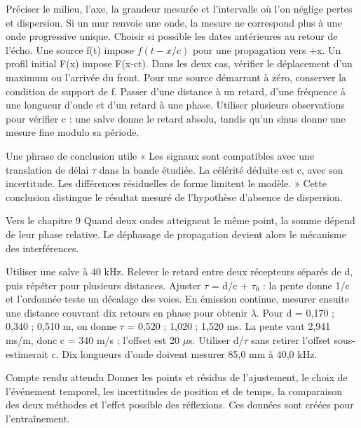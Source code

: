 Préciser le milieu, l’axe, la grandeur mesurée et l’intervalle où l’on néglige pertes et dispersion. Si un mur renvoie une onde, la mesure ne correspond plus à une onde progressive unique. Choisir si possible les dates antérieures au retour de l’écho.
Une source f(t) impose $f(t-x/c)$ pour une propagation vers +x. Un profil initial F(x) impose F(x-ct). Dans les deux cas, vérifier le déplacement d’un maximum ou l’arrivée du front. Pour une source démarrant à zéro, conserver la condition de support de f.
Passer d’une distance à un retard, d’une fréquence à une longueur d’onde et d’un retard à une phase. Utiliser plusieurs observations pour vérifier c : une salve donne le retard absolu, tandis qu’un sinus donne une mesure fine modulo sa période.
\begin{methode}{Une phrase de conclusion utile}
« Les signaux sont compatibles avec une translation de délai \ensuremath{\tau} dans la bande étudiée. La célérité déduite est c, avec son incertitude. Les différences résiduelles de forme limitent le modèle. » Cette conclusion distingue le résultat mesuré de l’hypothèse d’absence de dispersion.
\end{methode}
\begin{docu}{Vers le chapitre 9}
Quand deux ondes atteignent le même point, la somme dépend de leur phase relative. Le déphasage de propagation devient alors le mécanisme des interférences.
\end{docu}


Utiliser une salve à 40 kHz. Relever le retard entre deux récepteurs séparés de d, puis répéter pour plusieurs distances. Ajuster \ensuremath{\tau} = d/c + \ensuremath{\tau_0} : la pente donne 1/c et l’ordonnée teste un décalage des voies. En émission continue, mesurer ensuite une distance couvrant dix retours en phase pour obtenir \ensuremath{\lambda}.
Pour d = 0,170 ; 0,340 ; 0,510 m, on donne \ensuremath{\tau} = 0,520 ; 1,020 ; 1,520 ms. La pente vaut 2,941 ms/m, donc c = 340 m/s ; l’offset est 20 $\mu$s. Utiliser d/\ensuremath{\tau} sans retirer l’offset sous-estimerait c. Dix longueurs d’onde doivent mesurer 85,0 mm à 40,0 kHz.
\begin{methode}{Compte rendu attendu}
Donner les points et résidus de l’ajustement, le choix de l’événement temporel, les incertitudes de position et de temps, la comparaison des deux méthodes et l’effet possible des réflexions. Ces données sont créées pour l’entraînement.
\end{methode}


